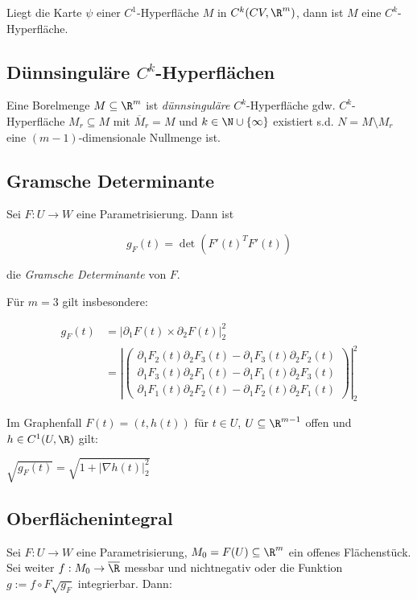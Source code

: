 Liegt die Karte $\psi$ einer $C^1$-Hyperfläche $M$ in $C^k(CV,\R^m)$, dann ist $M$ eine $C^k$-Hyperfläche.

\subsection*{Dünnsinguläre $C^k$-Hyperflächen}

Eine Borelmenge $M \subseteq \R^m$ ist \emph{dünnsinguläre} $C^k$-Hyperfläche gdw. $C^k$-Hyperfläche $M_r \subseteq M$ mit $\overline M_r = M$ und $k \in \N \cup \{\infty\}$ existiert s.d. $N = M \setminus M_r$ eine $(m-1)$-dimensionale Nullmenge ist.

\subsection*{Gramsche Determinante}

Sei $F : U \to W$ eine Parametrisierung. Dann ist

\vspace{-2mm}
$$g_F(t) = \det(F'(t)^TF'(t))$$

die \emph{Gramsche Determinante} von $F$.

\spacing

Für $m = 3$ gilt insbesondere:

\vspace{-4mm}
\begin{align*}
g_F(t) &= |\partial_1F(t) \times \partial_2F(t)|_2^2\\
       &= \left|\begin{pmatrix}
	\partial_1 F_2(t) \partial_2 F_3(t) - \partial_1 F_3(t) \partial_2 F_2(t) \\
	\partial_1 F_3(t) \partial_2 F_1(t) - \partial_1 F_1(t) \partial_2 F_3(t) \\
	\partial_1 F_1(t) \partial_2 F_2(t) - \partial_1 F_2(t) \partial_2 F_1(t)
\end{pmatrix}\right|_2^2
\end{align*}

Im Graphenfall $F(t) = (t,h(t))$ für $t \in U$, $U \subseteq \R^{m-1}$ offen und $h \in C^1(U,\R)$ gilt:

$\sqrt{g_F(t)} = \sqrt{1+|\nabla h(t)|_2^2}$

\subsection*{Oberflächenintegral}

Sei $F : U \to W$ eine Parametrisierung, $M_0 = F(U) \subseteq \R^m$ ein offenes Flächenstück. Sei weiter $f : M_0 \to \overline\R$ messbar und nichtnegativ oder die Funktion $g := f \circ F \sqrt{g_F}$ integrierbar. Dann:

